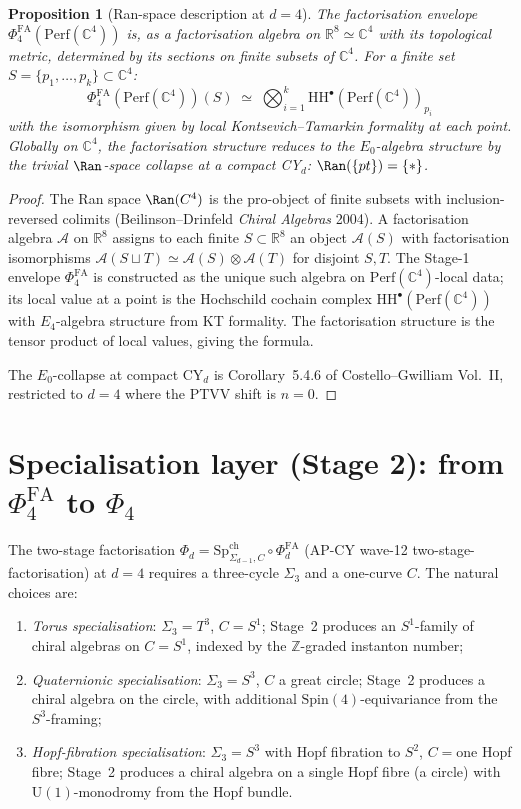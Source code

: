 \documentclass[11pt]{article}
\providecommand{\C}{\mathbb{C}}
\providecommand{\R}{\mathbb{R}}
\providecommand{\Z}{\mathbb{Z}}
\providecommand{\cA}{\mathcal{A}}
\providecommand{\Perf}{\mathrm{Perf}}
\providecommand{\Ezero}{E_0}
\providecommand{\HH}{\mathrm{HH}}
\providecommand{\PhiFA}{\Phi^{\mathrm{FA}}}
\providecommand{\SpCh}{\mathrm{Sp}^{\mathrm{ch}}}
\newtheorem{proposition}[theorem]{Proposition}
\theoremstyle{definition}
\begin{document}
\begin{proposition}[Ran-space description at $d = 4$]
\label{prop:ran-d4}
The factorisation envelope $\PhiFA_4(\Perf(\C^4))$ is, as a
factorisation algebra on $\R^8 \simeq \C^4$ with its topological
metric, determined by its sections on finite subsets of $\C^4$.
For a finite set $S = \{p_1, \ldots, p_k\} \subset \C^4$:
\[
  \PhiFA_4(\Perf(\C^4))(S)
  \;\simeq\; \bigotimes_{i=1}^{k} \HH^\bullet(\Perf(\C^4))_{p_i}
\]
with the isomorphism given by local Kontsevich--Tamarkin formality at each
point. Globally on $\C^4$, the factorisation structure reduces
to the $\Ezero$-algebra structure by the trivial $\Ran$-space
collapse at a compact CY$_d$: $\Ran(\{pt\}) = \{*\}$.
\end{proposition}

\begin{proof}
The Ran space $\Ran(\C^4)$ is the pro-object of finite subsets with
inclusion-reversed colimits (Beilinson--Drinfeld \emph{Chiral
Algebras} 2004). A factorisation algebra $\cA$ on $\R^8$ assigns to
each finite $S \subset \R^8$ an object $\cA(S)$ with factorisation
isomorphisms $\cA(S \sqcup T) \simeq \cA(S) \otimes \cA(T)$ for
disjoint $S, T$. The Stage-1 envelope $\PhiFA_4$ is constructed as
the unique such algebra on $\Perf(\C^4)$-local data; its local value
at a point is the Hochschild cochain complex
$\HH^\bullet(\Perf(\C^4))$ with $E_4$-algebra structure from KT
formality. The factorisation structure is the tensor product of
local values, giving the formula.

The $\Ezero$-collapse at compact CY$_d$ is Corollary~5.4.6 of
Costello--Gwilliam Vol.~II, restricted to $d = 4$ where the PTVV
shift is $n = 0$.
\end{proof}

\section{Specialisation layer (Stage 2): from $\PhiFA_4$ to
$\Phi_4$}
\label{sec:specialisation-d4}

The two-stage factorisation $\Phi_d = \SpCh_{\Sigma_{d-1}, C} \circ
\PhiFA_d$ (AP-CY wave-12 two-stage-factorisation) at $d = 4$ requires
a three-cycle $\Sigma_3$ and a one-curve $C$. The natural choices are:
\begin{enumerate}[label=(T\arabic*)]
  \item \emph{Torus specialisation}: $\Sigma_3 = T^3$, $C = S^1$; Stage~2
  produces an $S^1$-family of chiral algebras on $C = S^1$, indexed by
  the $\Z$-graded instanton number;
  \item \emph{Quaternionic specialisation}: $\Sigma_3 = S^3$, $C$ a
  great circle; Stage~2 produces a chiral algebra on the circle, with
  additional $\mathrm{Spin}(4)$-equivariance from the $S^3$-framing;
  \item \emph{Hopf-fibration specialisation}: $\Sigma_3 = S^3$ with
  Hopf fibration to $S^2$, $C = \text{one}$ Hopf fibre; Stage~2
  produces a chiral algebra on a single Hopf fibre (a circle) with
  $\mathrm{U}(1)$-monodromy from the Hopf bundle.
\end{enumerate}
\end{document}

